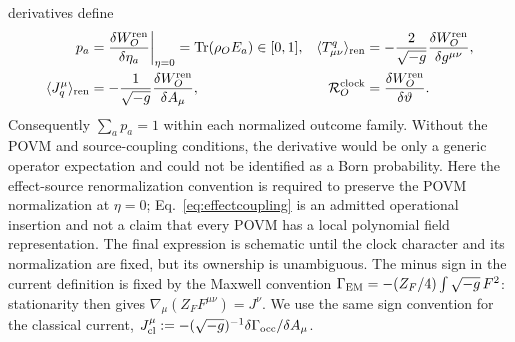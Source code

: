 \documentclass[11pt]{article}
\begin{document}
derivatives define
\begin{align}
p_a&={\delta W_O^{\rm ren}\over\delta\eta_a}\bigg|_{\eta=0}
=\operatorname{Tr}(\rho_OE_a)\in[0,1],
&\langle T^q_{\mu\nu}\rangle_{\rm ren}
&=-{2\over\sqrt{-g}}{\delta W_O^{\rm ren}\over\delta g^{\mu\nu}},
\label{eq:sourceowners1}\\
\langle J_q^\mu\rangle_{\rm ren}
&=-{1\over\sqrt{-g}}{\delta W_O^{\rm ren}\over\delta A_\mu},
&\mathcal R_O^{\rm clock}&={\delta W_O^{\rm ren}\over\delta\vartheta}.
\label{eq:sourceowners2}
\end{align}
Consequently $\sum_a p_a=1$ within each normalized outcome family.  Without
the POVM and source-coupling conditions, the derivative would be only a
generic operator expectation and could not be identified as a Born
probability.
Here the effect-source renormalization convention is required to preserve the
POVM normalization at $\eta=0$; Eq.~\eqref{eq:effectcoupling} is an admitted
operational insertion and not a claim that every POVM has a local polynomial
field representation.
The final expression is schematic until the clock character and its
normalization are fixed, but its ownership is unambiguous.
The minus sign in the current definition is fixed by the Maxwell convention
$\Gamma_{\rm EM}=-(Z_F/4)\int\sqrt{-g}\,F^2$: stationarity then gives
$\nabla_\mu(Z_FF^{\mu\nu})=J^\nu$.  We use the same sign convention for the
classical current,
$J_{\rm cl}^\mu:=-(\sqrt{-g})^{-1}\delta\Gamma_{\rm occ}/\delta A_\mu$.
\end{document}
